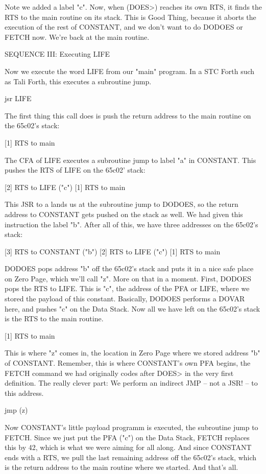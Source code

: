 Note we added a label "c". Now, when (DOES>) reaches its own RTS, it finds the
RTS to the main routine on its stack. This is Good Thing, because it aborts the
execution of the rest of CONSTANT, and we don't want to do DODOES or FETCH now.
We're back at the main routine. 


SEQUENCE III: Executing LIFE

Now we execute the word LIFE from our "main" program. In a STC Forth such as
Tali Forth, this executes a subroutine jump.

        jsr LIFE

The first thing this call does is push the return address to the main routine
on the 65c02's stack: 

        [1] RTS to main

The CFA of LIFE executes a subroutine jump to label "a" in CONSTANT. This
pushes the RTS of LIFE on the 65c02' stack:

        [2] RTS to LIFE ("c")
        [1] RTS to main

This JSR to a lands us at the subroutine jump to DODOES, so the return address
to CONSTANT gets pushed on the stack as well. We had given this instruction the
label "b". After all of this, we have three addresses on the 65c02's stack: 

        [3] RTS to CONSTANT ("b") 
        [2] RTS to LIFE ("c") 
        [1] RTS to main

DODOES pops address "b" off the 65c02's stack and puts it in a nice safe place
on Zero Page, which we'll call "z". More on that in a moment. First, DODOES
pops the RTS to LIFE. This is "c", the address of the PFA or LIFE, where we
stored the payload of this constant. Basically, DODOES performs a DOVAR here,
and pushes "c" on the Data Stack. Now all we have left on the 65c02's stack is
the RTS to the main routine.  

        [1] RTS to main

This is where "z" comes in, the location in Zero Page where we stored address
"b" of CONSTANT. Remember, this is where CONSTANT's own PFA begins, the FETCH
command we had originally codes after DOES> in the very first definition. The
really clever part: We perform an indirect JMP -- not a JSR! -- to this
address.

        jmp (z) 

Now CONSTANT's little payload programm is executed, the subroutine jump to
FETCH. Since we just put the PFA ("c") on the Data Stack, FETCH replaces this
by 42, which is what we were aiming for all along. And since CONSTANT ends with
a RTS, we pull the last remaining address off the 65c02's stack, which is the
return address to the main routine where we started. And that's all. 


